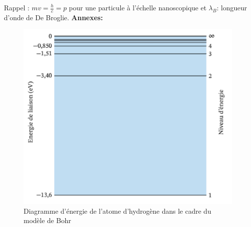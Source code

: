 \documentclass{article}
\begin{document}
Rappel : $mv = \frac{h}{c} = p$ pour une particule à l'échelle nanoscopique et $\lambda_{B}$: longueur d'onde de De Broglie.
\newpage
\noindent\textbf{Annexes:}\newline
\begin{figure}[h]
    \centering
    \includegraphics[scale=0.5]{figure2.png}
    \caption{Diagramme d'énergie de l'atome d'hydrogène dans le cadre du modèle de Bohr}
\end{figure}
\end{document}
